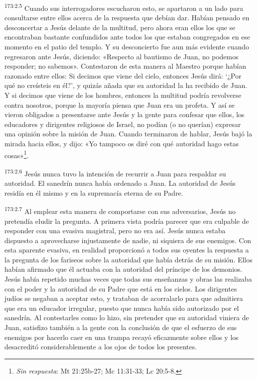 \par
\textsuperscript{173:2.5} Cuando sus interrogadores escucharon esto, se apartaron a un lado para consultarse entre ellos acerca de la respuesta que debían dar. Habían pensado en desconcertar a Jesús delante de la multitud, pero ahora eran ellos los que se encontraban bastante confundidos ante todos los que estaban congregados en ese momento en el patio del templo. Y su desconcierto fue aun más evidente cuando regresaron ante Jesús, diciendo: «Respecto al bautismo de Juan, no podemos responder; no sabemos». Contestaron de esta manera al Maestro porque habían razonado entre ellos: Si decimos que viene del cielo, entonces Jesús dirá: `¿Por qué no creísteis en él?', y quizás añada que su autoridad la ha recibido de Juan. Y si decimos que viene de los hombres, entonces la multitud podría revolverse contra nosotros, porque la mayoría piensa que Juan era un profeta. Y así se vieron obligados a presentarse ante Jesús y la gente para confesar que ellos, los educadores y dirigentes religiosos de Israel, no podían (o no querían) expresar una opinión sobre la misión de Juan. Cuando terminaron de hablar, Jesús bajó la mirada hacia ellos, y dijo: «Yo tampoco os diré con qué autoridad hago estas cosas»\footnote{\textit{Sin respuesta}: Mt 21:25b-27; Mc 11:31-33; Lc 20:5-8.}.

\par
\textsuperscript{173:2.6} Jesús nunca tuvo la intención de recurrir a Juan para respaldar su autoridad. El sanedrín nunca había ordenado a Juan. La autoridad de Jesús residía en él mismo y en la supremacía eterna de su Padre.

\par
\textsuperscript{173:2.7} Al emplear esta manera de comportarse con sus adversarios, Jesús no pretendía eludir la pregunta. A primera vista podría parecer que era culpable de responder con una evasiva magistral, pero no era así. Jesús nunca estaba dispuesto a aprovecharse injustamente de nadie, ni siquiera de sus enemigos. Con esta aparente evasiva, en realidad proporcionó a todos sus oyentes la respuesta a la pregunta de los fariseos sobre la autoridad que había detrás de su misión. Ellos habían afirmado que él actuaba con la autoridad del príncipe de los demonios. Jesús había repetido muchas veces que todas sus enseñanzas y obras las realizaba con el poder y la autoridad de su Padre que está en los cielos. Los dirigentes judíos se negaban a aceptar esto, y trataban de acorralarlo para que admitiera que era un educador irregular, puesto que nunca había sido autorizado por el sanedrín. Al contestarles como lo hizo, sin pretender que su autoridad viniera de Juan, satisfizo también a la gente con la conclusión de que el esfuerzo de sus enemigos por hacerlo caer en una trampa recayó eficazmente sobre ellos y los desacreditó considerablemente a los ojos de todos los presentes.


